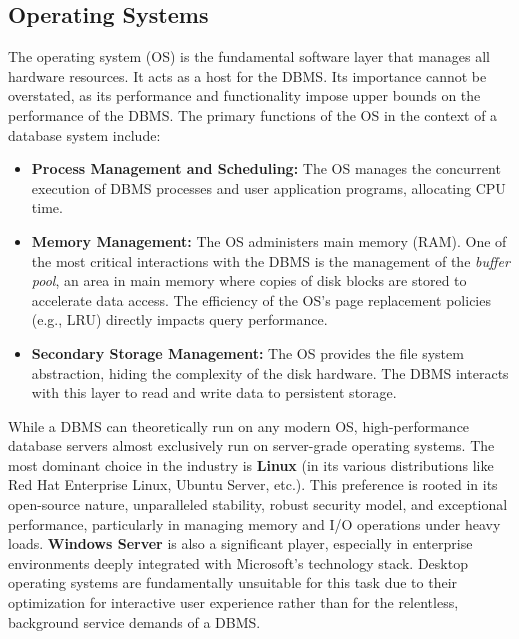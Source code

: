 \subsection{Operating Systems}
The operating system (OS) is the fundamental software layer that manages all hardware resources. It acts as a host for the DBMS. Its importance cannot be overstated, as its performance and functionality impose upper bounds on the performance of the DBMS. The primary functions of the OS in the context of a database system include:
\begin{itemize}
    \item \textbf{Process Management and Scheduling:} The OS manages the concurrent execution of DBMS processes and user application programs, allocating CPU time.
    \item \textbf{Memory Management:} The OS administers main memory (RAM). One of the most critical interactions with the DBMS is the management of the \textit{buffer pool}, an area in main memory where copies of disk blocks are stored to accelerate data access. The efficiency of the OS's page replacement policies (e.g., LRU) directly impacts query performance.
    \item \textbf{Secondary Storage Management:} The OS provides the file system abstraction, hiding the complexity of the disk hardware. The DBMS interacts with this layer to read and write data to persistent storage.
\end{itemize}

While a DBMS can theoretically run on any modern OS, high-performance database servers almost exclusively run on server-grade operating systems. The most dominant choice in the industry is \textbf{Linux} (in its various distributions like Red Hat Enterprise Linux, Ubuntu Server, etc.). This preference is rooted in its open-source nature, unparalleled stability, robust security model, and exceptional performance, particularly in managing memory and I/O operations under heavy loads. \textbf{Windows Server} is also a significant player, especially in enterprise environments deeply integrated with Microsoft's technology stack. Desktop operating systems are fundamentally unsuitable for this task due to their optimization for interactive user experience rather than for the relentless, background service demands of a DBMS.

